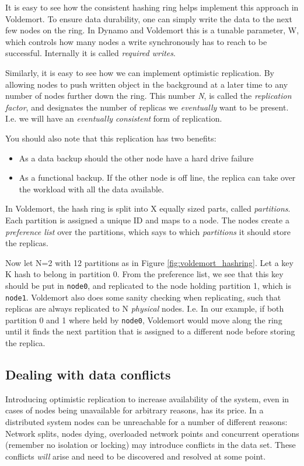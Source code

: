 It is easy to see how the consistent hashing ring helps implement this approach in Voldemort.
To ensure data durability, one can simply write the data to the next few nodes on the ring. In Dynamo and Voldemort this is a tunable parameter, W, which controls how many nodes a write synchronously has to reach to be successful. 
Internally it is called \emph{required writes}.

Similarly, it is easy to see how we can implement optimistic replication.
By allowing nodes to push written object in the background at a later time to any number of nodes further down the ring.
This number \emph{N}, is called the \emph{replication factor}, and designates the number of replicas we \emph{eventually} want to be present.
I.e. we will have an \emph{eventually consistent} form of replication.

You should also note that this replication has two benefits: 
\begin{itemize}
	\item As a data backup should the other node have a hard drive failure
	\item As a functional backup. If the other node is off line, the replica can take over the workload with all the data available.
\end{itemize}

In Voldemort, the hash ring is split into X equally sized parts, called \emph{partitions}. Each partition is assigned a unique ID and maps to a node.
The nodes create a \emph{preference list} over the partitions, which says to which \emph{partitions} it should store the replicas.

Now let N=2 with 12 partitions as in Figure \ref{fig:voldemort_hashring}. 
Let a key K hash to belong in partition 0. From the preference list, we see that this key should be put in \texttt{node0}, and replicated to the node holding partition 1, which is \texttt{node1}.
Voldemort also does some sanity checking when replicating, such that replicas are always replicated to N \emph{physical} nodes. 
I.e. In our example, if both partition 0 and 1 where held by \texttt{node0}, Voldemort would move along the ring until it finds the next partition that is assigned to a different node before storing the replica.

\subsection{Dealing with data conflicts}
Introducing optimistic replication to increase availability of the system, even in cases of nodes being unavailable for arbitrary reasons, has its price. 
In a distributed system nodes can be unreachable for a number of different reasons:
Network splits, nodes dying, overloaded network points and concurrent operations (remember no isolation or locking) may introduce conflicts in the data set.
These conflicts \emph{will} arise and need to be discovered and resolved at some point.

